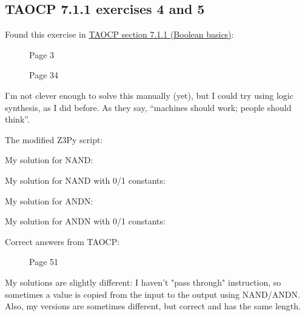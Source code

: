 \subsection{TAOCP 7.1.1 exercises 4 and 5}

Found this exercise in \href{http://www.cs.utsa.edu/~wagner/knuth/fasc0b.pdf}{TAOCP section 7.1.1 (Boolean basics)}:

\begin{figure}[H]
\centering
{}
\caption{Page 3}
\end{figure}

\begin{figure}[H]
\centering
{}
\caption{Page 34}
\end{figure}

I'm not clever enough to solve this manually (yet),
but I could try using logic synthesis, as I did before.
As they say, ``machines should work; people should think''.

The modified Z3Py script:



My solution for NAND:



My solution for NAND with 0/1 constants:



My solution for ANDN:



My solution for ANDN with 0/1 constants:



Correct answers from TAOCP:

\begin{figure}[H]
\centering
{}
\caption{Page 51}
\end{figure}

My solutions are slightly different: I haven't "pass through" instruction, so sometimes a value is copied from the input to the output using NAND/ANDN.
Also, my versions are sometimes different, but correct and has the same length.

